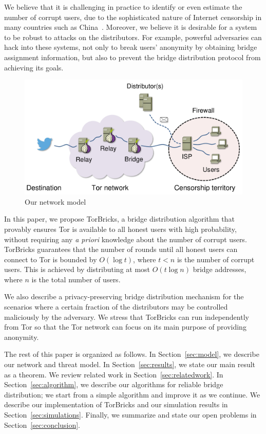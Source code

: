\documentclass[USenglish,oneside,twocolumn]{article}
\newcommand{\bricks}{}
\def\bricks/{\textsf{\sfsize \mbox{TorBricks}}}
\newcommand{\sfsize}{\fontsize{0.68\baselineskip}{0.68\baselineskip}\selectfont}
\begin{document}
We believe that it is challenging in practice to identify or even estimate the number of corrupt users, due to the sophisticated nature of Internet censorship in many countries such as China~\cite{Oni:2012:China,Ensafi2015b}. Moreover, we believe it is desirable for a system to be robust to attacks on the distributors. For example, powerful adversaries can hack into these systems, not only to break users' anonymity by obtaining bridge assignment information, but also to prevent the bridge distribution protocol from achieving its goals.%

\begin{figure}[t]
	\centering
	\includegraphics[width=0.6\linewidth]{images/model}
	\caption{Our network model}
	\label{fig:model}
\end{figure}

In this paper, we propose \bricks/, a bridge distribution algorithm that provably ensures Tor is available to all honest users with high probability, without requiring any \emph{a priori} knowledge about the number of corrupt users. \bricks/ guarantees that the number of rounds until all honest users can connect to Tor is bounded by $O(\log{t})$, where ${t<n}$ is the number of corrupt users. This is achieved by distributing at most $O(t\log{n})$ bridge addresses, where $n$ is the total number of users.

We also describe a privacy-preserving bridge distribution mechanism for the scenarios where a certain fraction of the distributors may be controlled maliciously by the adversary. 
We stress that \bricks/ can run independently from Tor so that the Tor network can focus on its main purpose of providing anonymity.

The rest of this paper is organized as follows. In Section~\ref{sec:model}, we describe our network and threat model. In Section~\ref{sec:results}, we state our main result as a theorem. We review related work in Section~\ref{sec:relatedwork}. In Section~\ref{sec:algorithm}, we describe our algorithms for reliable bridge distribution; we start from a simple algorithm and improve it as we continue. We describe our implementation of \bricks/ and our simulation results in Section~\ref{sec:simulations}. Finally, we summarize and state our open problems in Section~\ref{sec:conclusion}.
\end{document}
